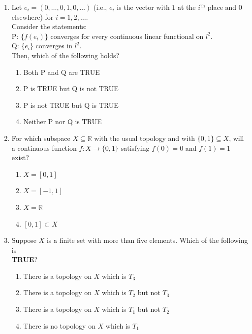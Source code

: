 \documentclass[journal]{IEEEtran}
\numberwithin{equation}{enumi}
\numberwithin{figure}{enumi}
\begin{document}
\begin{enumerate}
    \item Let $e_i = (0, \ldots, 0, 1, 0, \ldots)$ (i.e., $e_i$ is the vector with $1$ at the $i^\text{th}$ place and $0$ elsewhere) for $i = 1, 2, \ldots$. \\
    Consider the statements: \\
    P: $\{f(e_i)\}$ converges for every continuous linear functional on $l^2$. \\
    Q: $\{e_i\}$ converges in $l^2$. \\
    Then, which of the following holds?
\hfill{}
\begin{multicols}{2}
\begin{enumerate}
\item  Both P and Q are TRUE
\item  P is TRUE but Q is not TRUE
\item  P is not TRUE but Q is TRUE
\item  Neither P nor Q is TRUE
\end{enumerate}
\end{multicols}
    

    
\item For which subspace $X \subseteq \mathbb{R}$ with the usual topology and with $\{0,1\} \subseteq X$, will a continuous function $f : X \to \{0, 1\}$ satisfying $f(0) = 0$ and $f(1) = 1$ exist?
 \hfill{}
\begin{multicols}{2}
\begin{enumerate}
\item  $X = [0,1]$
\item $X = [-1,1]$
\item $X = \mathbb{R}$
\item $[0,1] \subset X$
\end{enumerate}
\end{multicols}


\newpage

 \item Suppose $X$ is a finite set with more than five elements. Which of the following is\\ \textbf{TRUE}?   \hfill{}

\begin{enumerate}
    \item There is a topology on $X$ which is $T_3$
    \item There is a topology on $X$ which is $T_2$ but not $T_3$
    \item There is a topology on $X$ which is $T_1$ but not $T_2$
    \item There is no topology on $X$ which is $T_1$
\end{enumerate}


\end{enumerate}
\end{document}
